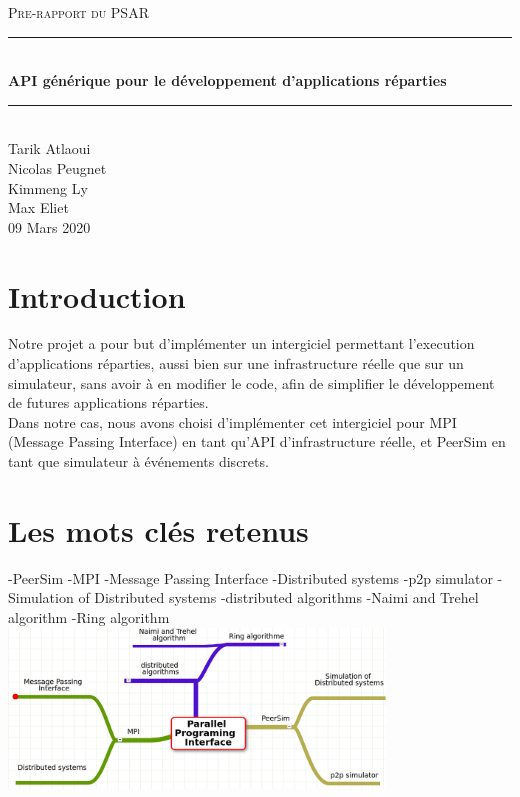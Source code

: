 \documentclass{article}
\date{\today}
\author{Tarik Atlaoui \\ Nicolas Peugnet \\ Kimmeng Ly \\ Max Eliet}
\begin{document}
\begin{titlepage}
	\enlargethispage{2cm}
	\newcommand{\HRule}{\rule{\linewidth}{0.5mm}}
	\center
	\textsc{\LARGE
	Pre-rapport du PSAR 
	} \\[1cm]
	\HRule \\[0.4cm]
	{ \huge \bfseries API générique pour le développement d'applications réparties \\[0.15cm] }
	\HRule \\[4cm]
	\large{Tarik Atlaoui \\[3mm] Nicolas Peugnet \\[3mm] Kimmeng Ly \\[3mm] Max Eliet} \\[3cm]
	09 Mars 2020 \\[3cm]
\end{titlepage}

	\newpage
		\section{Introduction}
			\large{
			\indent Notre projet a pour but d'implémenter un intergiciel permettant l'execution d'applications réparties, aussi bien sur une infrastructure réelle que sur un simulateur, sans avoir à en modifier le code, afin de simplifier le développement de futures applications réparties.
\\[2mm]
			 \indent Dans notre cas, nous avons choisi d'implémenter cet intergiciel pour MPI (Message Passing Interface) en tant qu'API d'infrastructure réelle, et PeerSim en tant que simulateur à événements discrets.}
		
		\section{Les mots clés retenus}
		-PeerSim
		\newline
		-MPI
		\newline
		-Message Passing Interface
		\newline
		-Distributed systems
		\newline
		-p2p simulator
		\newline
		-Simulation of Distributed systems
		\newline
		-distributed algorithms
		\newline
		-Naimi and Trehel algorithm
		\newline
		-Ring algorithm
		\newline 
		\includegraphics[width=10cm]{mindmap.png}
\end{document}

